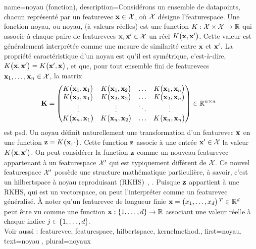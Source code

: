 {name={noyau (fonction)}, 
	description={Considérons un ensemble de \glspl{datapoint}, chacun représenté par un \gls{featurevec} 
		${\bf x} \in \mathcal{X}$, où $\mathcal{X}$ désigne l’\gls{featurespace}. 
		Une fonction noyau, ou noyau, (à valeurs réelles) est une \gls{function} 
		$K: \mathcal{X} \times \mathcal{X} \rightarrow \mathbb{R}$ qui associe à chaque paire de 
		\glspl{featurevec} ${\bf x}, {\bf x}' \in \mathcal{X}$ un réel $K\big({\bf x},{\bf x}'\big)$. 
		Cette valeur est généralement interprétée comme une mesure de similarité entre ${\bf x}$ et ${\bf x}'$. 
		La propriété caractéristique d’un noyau est qu’il est symétrique, c’est-à-dire, 
		$K\big({\bf x},{\bf x}'\big) = K\big({\bf x}',{\bf x}\big)$, et que, 
		pour tout ensemble fini de \glspl{featurevec} ${\bf x}_1, \ldots, {\bf x}_n \in \mathcal{X}$, la \gls{matrix} 
		\begin{equation}
			\nonumber
			\mathbf{K} = \begin{pmatrix}
				K\big({\bf x}_1,{\bf x}_1\big) & K\big({\bf x}_1,{\bf x}_2\big) & \ldots & K\big({\bf x}_1,{\bf x}_n\big) \\
				K\big({\bf x}_2,{\bf x}_1\big) & K\big({\bf x}_2,{\bf x}_2\big) & \ldots & K\big({\bf x}_2,{\bf x}_n\big) \\
				\vdots											
				& \vdots & \ddots & \vdots \\
				K\big({\bf x}_n,{\bf x}_1\big) & K\big({\bf x}_n,{\bf x}_2\big) & \ldots & K\big({\bf x}_n,{\bf x}_n\big) 
			\end{pmatrix} \in \mathbb{R}^{n \times n}
		\end{equation}
		est \gls{psd}. 
		Un noyau définit naturellement une transformation d’un \gls{featurevec} ${\bf x}$ en une 
		\gls{function} ${\bf z} = K\big({\bf x},\cdot\big)$. Cette \gls{function} ${\bf z}$ associe à une 
		entrée ${\bf x}' \in \mathcal{X}$ la valeur $K\big({\bf x},{\bf x}'\big)$. 
		On peut considérer la \gls{function} ${\bf z}$ comme un nouveau \gls{featurevec} appartenant à un 
		\gls{featurespace} $\mathcal{X}'$ qui est typiquement différent de $\mathcal{X}$. 
		Ce nouvel \gls{featurespace} $\mathcal{X}'$ possède une structure mathématique particulière, à savoir, c’est un \gls{hilbertspace} à noyau reproduisant (RKHS)~\cite{LearningKernelsBook}, \cite{LampertNowKernel}.
		Puisque ${\bf z}$ appartient à une RKHS, qui est un \gls{vectorspace}, on peut l’interpréter comme un 
		\gls{featurevec} généralisé. À noter qu’un \gls{featurevec} de longueur finie 
		${\bf x}=\big(x_{1},\ldots,x_{d} \big)\,^{T} \in \mathbb{R}^{d}$ 
		peut être vu comme une \gls{function} ${\bf x}: \{1, \ldots, d\} \rightarrow \mathbb{R}$ 
		associant une valeur réelle à chaque indice $j \in \{1,\ldots,d\}$.
		\\
		Voir aussi : \gls{featurevec}, \gls{featurespace}, \gls{hilbertspace}, \gls{kernelmethod}.},
	first={noyau},
	text={noyau} , plural={noyaux}
}

